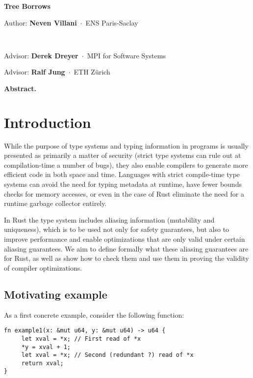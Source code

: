 \documentclass[a4paper,11pt]{article}
\newcommand{\myaff}[1]{\,$\cdot$\, {\small #1}\par\smallskip}
\newcommand{\fakeparagraph}[2]{\par\noindent\textbf{#1}\hspace{1em}#2}
\theoremstyle{plain}
\theoremstyle{definition}
\theoremstyle{remark}
\newenvironment{myabstract}
{\list{}{\listparindent 1.5em%
        \itemindent    \listparindent
        \leftmargin    0cm
        \rightmargin   0cm
        \parsep        0pt}%
    \item\relax}
{\endlist}
\newenvironment{mycover}
{\list{}{\listparindent 0pt
        \itemindent    \listparindent
        \leftmargin    0cm
        \rightmargin   0cm
        \parsep        0pt}%
    \raggedright
    \item\relax}
{\endlist}
\begin{document}
\begin{mycover}
{\huge\bfseries\boldmath Tree Borrows\par}
\bigskip
\bigskip
\bigskip


Author: \textbf{Neven Villani}
\myaff{ENS Paris-Saclay}

~\newline

Advisor: \textbf{Derek Dreyer}
\myaff{MPI for Software Systems}


Advisor: \textbf{Ralf Jung}
\myaff{ETH Zürich}


\end{mycover}
\medskip

\begin{myabstract}
\fakeparagraph{Abstract.}
\end{myabstract}
\medskip


\section{Introduction}

While the purpose of type systems and typing information in programs is usually
presented as primarily a matter of security (strict type systems can rule out
at compilation-time a number of bugs), they also enable compilers to generate
more efficient code in both space and time. Languages with strict compile-time
type systems can avoid the need for typing metadata at runtime, have fewer
bounds checks for memory accesses, or even in the case of Rust eliminate the
need for a runtime garbage collector entirely.

In Rust the type system includes aliasing information (mutability and uniqueness),
which is to be used not only for safety guarantees, but also to improve
performance and enable optimizations that are only valid under certain aliasing
guarantees.
We aim to define formally what these aliasing guarantees are for Rust, as
well as show how to check them and use them in proving the validity of compiler
optimizations.

\subsection{Motivating example}

As a first concrete example, consider the following function:
\begin{lstlisting}
fn example1(x: &mut u64, y: &mut u64) -> u64 {
     let xval = *x; // First read of *x
     *y = xval + 1;
     let xval = *x; // Second (redundant ?) read of *x
     return xval;
}
\end{lstlisting}
\end{document}
